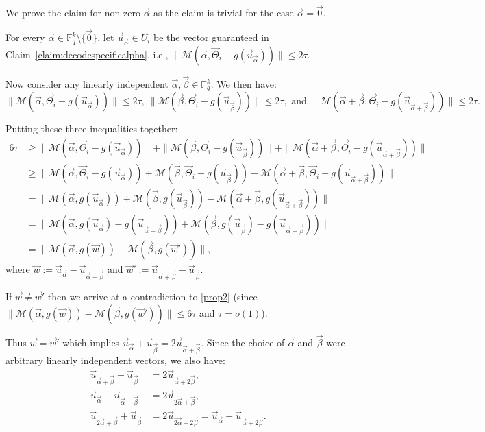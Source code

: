 \documentclass[11pt]{article}
\newcommand{\F}{\mathbb{F}}
\renewcommand{\ge}{ \geqslant}
\renewcommand{\le}{ \leqslant}
\renewcommand{\kappa}{\tau}
\newcommand{\M}{\mathcal{M}}
\begin{document}
We prove the claim for non-zero $\vec{\alpha}$ as the claim is trivial for the case $\vec{\alpha}=\vec{0}$.

For every $\vec{\alpha}\in\F_q^k\setminus \{\vec{0}\}$, let $\vec{u}_{\vec{\alpha}}\in U_i$ be the vector guaranteed in Claim~\ref{claim:decodespecificalpha}, i.e., 
$\|\M(  \vec{\alpha},\vec{\Theta}_i-g(\vec{u}_{\vec{\alpha}})) \|\le 2\kappa$. 

Now consider any linearly independent $\vec{\alpha},\vec{\beta}\in\F_q^k$. We then have: 
 $$
 \|\M(  \vec{\alpha},\vec{\Theta}_i-g(\vec{u}_{\vec{\alpha}})) \|\le 2\kappa,\ \|\M(  \vec{\beta},\vec{\Theta}_i-g(\vec{u}_{\vec{\beta}})) \|\le 2\kappa,\text{ and }\|\M(  \vec{\alpha}+\vec{\beta},\vec{\Theta}_i-g(\vec{u}_{\vec{\alpha}+\vec{\beta}})) \|\le 2\kappa.
 $$

Putting these three inequalities together:
\begin{align*}
 6\kappa&\ge \|\M(  \vec{\alpha},\vec{\Theta}_i-g(\vec{u}_{\vec{\alpha}})) \|+\|\M(  \vec{\beta},\vec{\Theta}_i-g(\vec{u}_{\vec{\beta}})) \|+\|\M(  \vec{\alpha}+\vec{\beta},\vec{\Theta}_i-g(\vec{u}_{\vec{\alpha}+\vec{\beta}})) \|\\
  &\ge\|\M(  \vec{\alpha},\vec{\Theta}_i-g(\vec{u}_{\vec{\alpha}})) +\M(  \vec{\beta},\vec{\Theta}_i-g(\vec{u}_{\vec{\beta}})) -\M(  \vec{\alpha}+\vec{\beta},\vec{\Theta}_i-g(\vec{u}_{\vec{\alpha}+\vec{\beta}})) \|\\
  &=\|\M(  \vec{\alpha},g(\vec{u}_{\vec{\alpha}})) +\M(  \vec{\beta},g(\vec{u}_{\vec{\beta}})) -\M(  \vec{\alpha}+\vec{\beta},g(\vec{u}_{\vec{\alpha}+\vec{\beta}})) \|\\
    &=\|\M(  \vec{\alpha},g(\vec{u}_{\vec{\alpha}})-g(\vec{u}_{\vec{\alpha}+\vec{\beta}})) +\M(  \vec{\beta},g(\vec{u}_{\vec{\beta}})-g(\vec{u}_{\vec{\alpha}+\vec{\beta}})) \|\\
      &=\|\M(  \vec{\alpha},g(\vec{w})) -\M(  \vec{\beta},g(\vec{w}')) \|,
\end{align*}
where $\vec{w}:=\vec{u}_{\vec{\alpha}}-\vec{u}_{\vec{\alpha}+\vec{\beta}}$ and $\vec{w}':=\vec{u}_{\vec{\alpha}+\vec{\beta}}-\vec{u}_{\vec{\beta}}$.

 

If $\vec{w}\neq\vec{w}'$ then  we arrive at a  contradiction  to \eqref{prop2} (since $\|\M(  \vec{\alpha},g(\vec{w}))-\M(  \vec{\beta},g(\vec{w}')) \|\le 6\kappa$ and $\kappa=o(1)$). 



Thus $\vec{w}=\vec{w}'$ which implies $\vec{u}_{\vec{\alpha}}+\vec{u}_{\vec{\beta}}=2\vec{u}_{\vec{\alpha}+\vec{\beta}}$. Since the choice of $\vec{\alpha}$ and $\vec{\beta}$ were arbitrary  linearly independent  vectors, we also have:
\begin{align*}
\vec{u}_{\vec{\alpha}+\vec{\beta}}+\vec{u}_{\vec{\beta}}&=2\vec{u}_{\vec{\alpha}+2\vec{\beta}},\\ \vec{u}_{\vec{\alpha}}+\vec{u}_{\vec{\alpha}+\vec{\beta}}&=2\vec{u}_{2\vec{\alpha}+\vec{\beta}},
\\ \vec{u}_{2\vec{\alpha}+\vec{\beta}}+\vec{u}_{\vec{\beta}}&=2\vec{u}_{\vec{2\alpha}+2\vec{\beta}}=\vec{u}_{\vec{\alpha}}+\vec{u}_{\vec{\alpha}+2\vec{\beta}}.
\end{align*}  
\end{document}
